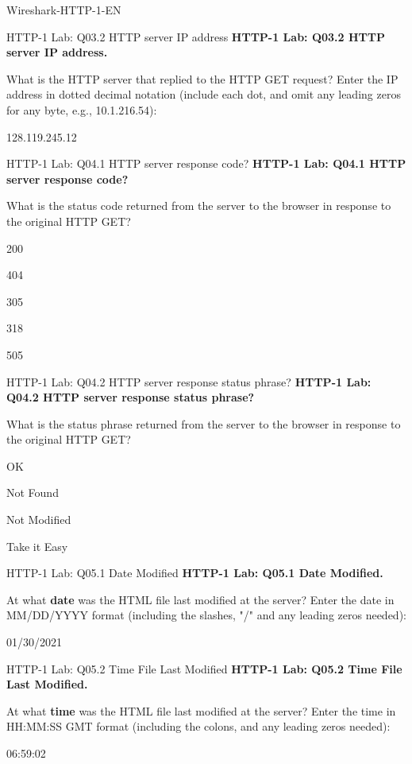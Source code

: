 \documentclass[a4paper]{article}
\begin{document}
\begin{quiz}{Wireshark-HTTP-1-EN}
\begin{shortanswer}[points=1]{HTTP-1 Lab: Q03.2 HTTP server IP address}
\textbf{HTTP-1 Lab: Q03.2 HTTP server IP address.} 

What is the HTTP server that replied to the HTTP GET request? Enter the IP address in dotted decimal notation (include each dot, and omit any leading zeros for any byte, e.g., 10.1.216.54): 
\item 128.119.245.12
\end{shortanswer}

\begin{multi}[points=1,shuffle]{HTTP-1 Lab: Q04.1 HTTP server response code?}
\textbf{HTTP-1 Lab: Q04.1 HTTP server response code?} 

What is the status code returned from the server to the browser in response to the original HTTP GET? 
\item* 200
\item 404
\item 305
\item 318
\item 505
\end{multi}

\begin{multi}[points=1,shuffle]{HTTP-1 Lab: Q04.2 HTTP server response status phrase?}
\textbf{HTTP-1 Lab: Q04.2 HTTP server response status phrase?} 

What is the status phrase returned from the server to the browser in response to the original HTTP GET? 
\item* OK
\item Not Found
\item Not Modified
\item Take it Easy
\end{multi}

\begin{shortanswer}[points=1]{HTTP-1 Lab: Q05.1 Date Modified}
\textbf{HTTP-1 Lab: Q05.1 Date Modified.} 

At what \textbf{date} was the HTML file last modified at the server? Enter the date in MM/DD/YYYY format (including the slashes, "/" and any leading zeros needed):
\item 01/30/2021
\end{shortanswer}

\begin{shortanswer}[points=1]{HTTP-1 Lab: Q05.2 Time File Last Modified}
\textbf{HTTP-1 Lab: Q05.2 Time File Last Modified.} 

At what \textbf{time} was the HTML file last modified at the server? Enter the time in HH:MM:SS GMT format (including the colons, and any leading zeros needed):
\item 06:59:02
\end{shortanswer}


\end{quiz}
\end{document}
